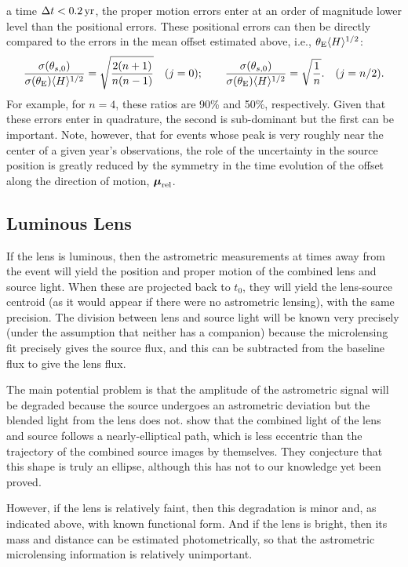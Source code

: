 \documentclass[12pt,preprint]{aastex}
\newcommand{\bdv}[1]{\mbox{\boldmath$#1$}}
\def\rel{{\rm rel}}
\def\e{{\rm E}}
\def\bmu{{\bdv\mu}}
\begin{document}
a time $\Delta t < 0.2\,{\rm yr}$, the proper motion errors
enter at an order of magnitude lower level than the positional errors.
{These positional errors can then be directly compared to the errors in
the mean offset estimated above, i.e., $\theta_\e\langle H\rangle^{1/2}$:
\begin{equation}
{\sigma(\theta_{s,0})\over\sigma(\theta_\e)\langle H\rangle^{1/2}} =
\sqrt{2(n+1)\over n(n -1)}
\quad (j=0);
\qquad
{\sigma(\theta_{s,0})\over\sigma(\theta_\e)\langle H\rangle^{1/2}} =
\sqrt{1\over n}.
\quad (j=n/2).
\label{eqn:errrat2}
\end{equation}
For example, for $n=4$, these
ratios are 90\% and 50\%, respectively.  Given that these errors enter
in quadrature, the second is sub-dominant but the first can be important.
Note, however, that for events whose peak is very roughly near the
center of a given year's observations, the role of the uncertainty
in the source position is greatly reduced by the symmetry in the
time evolution of the offset along the direction of motion, $\bmu_\rel$.
}

\subsection{{Luminous Lens}
\label{sec:luminous}}


If the lens is luminous, then the astrometric measurements at times
away from the event will yield the position and proper motion of
the combined lens and source light.  When these are projected back
to $t_0$, they will yield the lens-source centroid (as it would appear
if there were no astrometric lensing), with the same precision.
The division between lens and source light will be known very
precisely (under the assumption that neither has a companion) because
the microlensing fit precisely gives the source flux, and this
can be subtracted from the baseline flux to give the lens flux.

The main potential problem is that the amplitude of the astrometric
signal will be degraded because the source undergoes an astrometric
deviation but the blended light from the lens does not.  \citet{han99}
show that the combined light of the lens and source follows a
nearly-elliptical path, which is less eccentric than the
trajectory of the combined source images by themselves.  They conjecture
that this shape is truly an ellipse, although this has not to our
knowledge yet been proved.

However, if the lens is relatively faint, then this degradation is
minor and, as indicated above, with known functional form.  And if
the lens is bright, then its mass and distance can be estimated 
photometrically, so that the astrometric microlensing information is
relatively unimportant.
\end{document}
